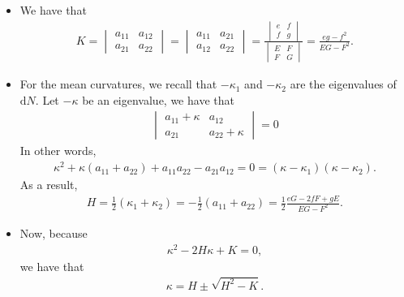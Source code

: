 \documentclass[10pt]{article}
\newcommand{\dee}{\mathrm{d}}
\begin{document}
\begin{itemize}
    \item We have that
    \begin{align*}
      K 
      =
      \begin{vmatrix}
        a_{11} & a_{12}\\
        a_{21} & a_{22}
      \end{vmatrix}
      =
      \begin{vmatrix}
        a_{11} & a_{21}\\
        a_{12} & a_{22}
      \end{vmatrix}
      =
      \frac
      {
        \begin{vmatrix}
          e & f \\
          f & g
        \end{vmatrix}
      }
      {
        \begin{vmatrix}
          E & F \\
          F & G
        \end{vmatrix}
      }
      = \frac{eg-f^2}{EG-F^2}.
    \end{align*}

    \item For the mean curvatures, we recall that $-\kappa_1$ and $-\kappa_2$ are the eigenvalues of $\dee N$. Let $-\kappa$ be an eigenvalue, we have that
    \begin{align*}
      \begin{vmatrix}
        a_{11} + \kappa & a_{12}\\
        a_{21} & a_{22} + \kappa
      \end{vmatrix}
      = 
      0
    \end{align*}
    In other words,
    \begin{align*}
      \kappa^2 + \kappa(a_{11} + a_{22}) + a_{11}a_{22} - a_{21}a_{12} = 0 = (\kappa - \kappa_1)(\kappa - \kappa_2).
    \end{align*}
    As a result,
    \begin{align*}
      H = \frac{1}{2}(\kappa_1 + \kappa_2) = -\frac{1}{2}(a_{11}+a_{22}) = \frac{1}{2} \frac{eG - 2fF + gE}{EG-F^2}.
    \end{align*}

    \item Now, because
    \begin{align*}
      \kappa^2 - 2H\kappa + K = 0,
    \end{align*}
    we have that
    \begin{align*}
      \kappa = H \pm \sqrt{H^2 - K}.
    \end{align*}


\end{itemize}
\end{document}
